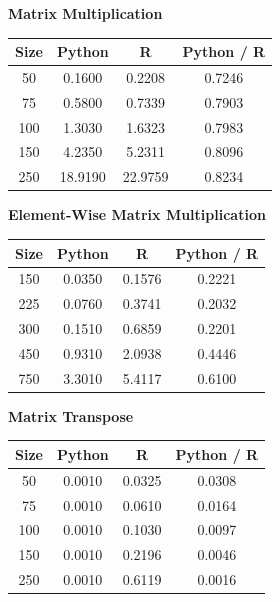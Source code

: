 \documentclass[%
  final,
  notitlepage,
  narroweqnarray,
  inline,
]{ieee}
\begin{document}
\begin{table}[h!]
  \scriptsize
  \begin{center}
    \vspace{1em}
    \textbf{Matrix Multiplication} \\
    \begin{tabular}{cccc}
      Size  & Python  &  R    & Python / R \\
      \hline
      50  & 0.1600  & 0.2208  & 0.7246 \\
      75  & 0.5800  & 0.7339  & 0.7903 \\
      100 & 1.3030  & 1.6323  & 0.7983 \\
      150 & 4.2350  & 5.2311  & 0.8096 \\
      250 & 18.9190 & 22.9759 & 0.8234 \\
    \end{tabular}

    \vspace{1em}
    \textbf{Element-Wise Matrix Multiplication} \\
    \begin{tabular}{cccc}
      Size  & Python  &  R       & Python / R \\
      \hline
      150   & 0.0350  &  0.1576  &  0.2221 \\
      225   & 0.0760  &  0.3741  &  0.2032 \\
      300   & 0.1510  &  0.6859  &  0.2201 \\
      450   & 0.9310  &  2.0938  &  0.4446 \\
      750   & 3.3010  &  5.4117  &  0.6100 \\
    \end{tabular}

    \vspace{1em}
    \textbf{Matrix Transpose} \\
    \begin{tabular}{cccc}
      Size  & Python  &  R       & Python / R \\
      \hline
      50  & 0.0010  & 0.0325 & 0.0308 \\
      75  & 0.0010  & 0.0610 & 0.0164 \\
      100 & 0.0010  & 0.1030 & 0.0097 \\
      150 & 0.0010  & 0.2196 & 0.0046 \\
      250 & 0.0010  & 0.6119 & 0.0016 \\
    \end{tabular}


\end{center}
\end{table}
\end{document}
